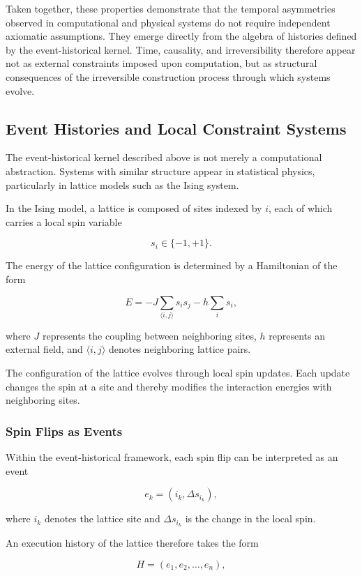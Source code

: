 \documentclass[12pt]{article}
\begin{document}
Taken together, these properties demonstrate that the
temporal asymmetries observed in computational and
physical systems do not require independent axiomatic
assumptions. They emerge directly from the algebra of
histories defined by the event-historical kernel. Time,
causality, and irreversibility therefore appear not as
external constraints imposed upon computation, but as
structural consequences of the irreversible construction
process through which systems evolve.

\subsection{Event Histories and Local Constraint Systems}

The event-historical kernel described above is not merely
a computational abstraction. Systems with similar structure
appear in statistical physics, particularly in lattice models
such as the Ising system.

In the Ising model, a lattice is composed of sites indexed by
$i$, each of which carries a local spin variable

\[
s_i \in \{-1, +1\}.
\]

The energy of the lattice configuration is determined by a
Hamiltonian of the form

\[
E = -J \sum_{\langle i,j \rangle} s_i s_j - h \sum_i s_i ,
\]

where $J$ represents the coupling between neighboring sites,
$h$ represents an external field, and $\langle i,j \rangle$
denotes neighboring lattice pairs.

The configuration of the lattice evolves through local spin
updates. Each update changes the spin at a site and thereby
modifies the interaction energies with neighboring sites.

\subsubsection{Spin Flips as Events}

Within the event-historical framework, each spin flip can be
interpreted as an event

\[
e_k = (i_k, \Delta s_{i_k}),
\]

where $i_k$ denotes the lattice site and $\Delta s_{i_k}$ is
the change in the local spin.

An execution history of the lattice therefore takes the form

\[
H = (e_1, e_2, \dots, e_n),
\]
\end{document}
